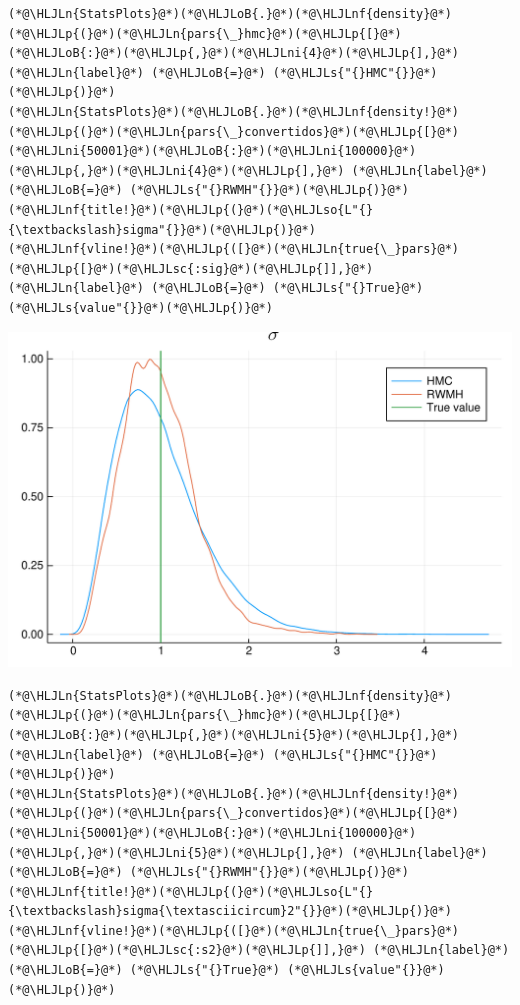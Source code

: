 \documentclass[12pt,a4paper]{article}
\newcommand{\HLJLn}[1]{#1}
\newcommand{\HLJLnf}[1]{\textcolor[RGB]{66,102,213}{#1}}
\newcommand{\HLJLs}[1]{\textcolor[RGB]{201,61,57}{#1}}
\newcommand{\HLJLsc}[1]{\textcolor[RGB]{201,61,57}{#1}}
\newcommand{\HLJLso}[1]{\textcolor[RGB]{201,61,57}{#1}}
\newcommand{\HLJLni}[1]{\textcolor[RGB]{59,151,46}{#1}}
\newcommand{\HLJLoB}[1]{\textcolor[RGB]{102,102,102}{\textbf{#1}}}
\newcommand{\HLJLp}[1]{#1}
\begin{document}
\begin{lstlisting}
(*@\HLJLn{StatsPlots}@*)(*@\HLJLoB{.}@*)(*@\HLJLnf{density}@*)(*@\HLJLp{(}@*)(*@\HLJLn{pars{\_}hmc}@*)(*@\HLJLp{[}@*)(*@\HLJLoB{:}@*)(*@\HLJLp{,}@*)(*@\HLJLni{4}@*)(*@\HLJLp{],}@*) (*@\HLJLn{label}@*) (*@\HLJLoB{=}@*) (*@\HLJLs{"{}HMC"{}}@*)(*@\HLJLp{)}@*)
(*@\HLJLn{StatsPlots}@*)(*@\HLJLoB{.}@*)(*@\HLJLnf{density!}@*)(*@\HLJLp{(}@*)(*@\HLJLn{pars{\_}convertidos}@*)(*@\HLJLp{[}@*)(*@\HLJLni{50001}@*)(*@\HLJLoB{:}@*)(*@\HLJLni{100000}@*)(*@\HLJLp{,}@*)(*@\HLJLni{4}@*)(*@\HLJLp{],}@*) (*@\HLJLn{label}@*) (*@\HLJLoB{=}@*) (*@\HLJLs{"{}RWMH"{}}@*)(*@\HLJLp{)}@*)
(*@\HLJLnf{title!}@*)(*@\HLJLp{(}@*)(*@\HLJLso{L"{}{\textbackslash}sigma"{}}@*)(*@\HLJLp{)}@*)
(*@\HLJLnf{vline!}@*)(*@\HLJLp{([}@*)(*@\HLJLn{true{\_}pars}@*)(*@\HLJLp{[}@*)(*@\HLJLsc{:sig}@*)(*@\HLJLp{]],}@*) (*@\HLJLn{label}@*) (*@\HLJLoB{=}@*) (*@\HLJLs{"{}True}@*) (*@\HLJLs{value"{}}@*)(*@\HLJLp{)}@*)
\end{lstlisting}

\includegraphics[width=\linewidth]{figures/dsge_and_julia_47_1.pdf}

\begin{lstlisting}
(*@\HLJLn{StatsPlots}@*)(*@\HLJLoB{.}@*)(*@\HLJLnf{density}@*)(*@\HLJLp{(}@*)(*@\HLJLn{pars{\_}hmc}@*)(*@\HLJLp{[}@*)(*@\HLJLoB{:}@*)(*@\HLJLp{,}@*)(*@\HLJLni{5}@*)(*@\HLJLp{],}@*) (*@\HLJLn{label}@*) (*@\HLJLoB{=}@*) (*@\HLJLs{"{}HMC"{}}@*)(*@\HLJLp{)}@*)
(*@\HLJLn{StatsPlots}@*)(*@\HLJLoB{.}@*)(*@\HLJLnf{density!}@*)(*@\HLJLp{(}@*)(*@\HLJLn{pars{\_}convertidos}@*)(*@\HLJLp{[}@*)(*@\HLJLni{50001}@*)(*@\HLJLoB{:}@*)(*@\HLJLni{100000}@*)(*@\HLJLp{,}@*)(*@\HLJLni{5}@*)(*@\HLJLp{],}@*) (*@\HLJLn{label}@*) (*@\HLJLoB{=}@*) (*@\HLJLs{"{}RWMH"{}}@*)(*@\HLJLp{)}@*)
(*@\HLJLnf{title!}@*)(*@\HLJLp{(}@*)(*@\HLJLso{L"{}{\textbackslash}sigma{\textasciicircum}2"{}}@*)(*@\HLJLp{)}@*)
(*@\HLJLnf{vline!}@*)(*@\HLJLp{([}@*)(*@\HLJLn{true{\_}pars}@*)(*@\HLJLp{[}@*)(*@\HLJLsc{:s2}@*)(*@\HLJLp{]],}@*) (*@\HLJLn{label}@*) (*@\HLJLoB{=}@*) (*@\HLJLs{"{}True}@*) (*@\HLJLs{value"{}}@*)(*@\HLJLp{)}@*)
\end{lstlisting}
\end{document}
